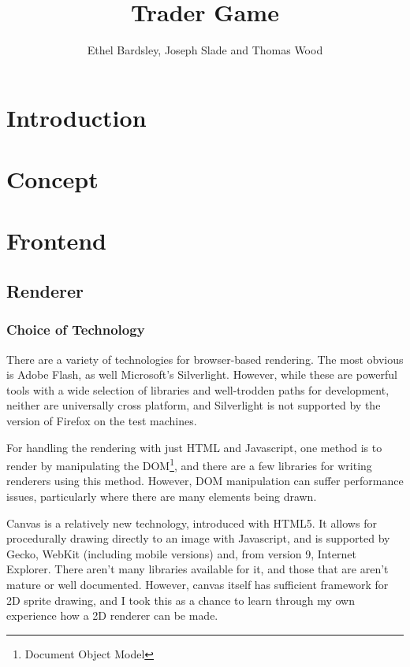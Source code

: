 \documentclass[12pt]{amsart}
\title{Trader Game}
\author{Ethel Bardsley, Joseph Slade and Thomas Wood}
\begin{document}
\maketitle

\section{Introduction}
\section{Concept}
\section{Frontend}
  \subsection{Renderer}
    \subsubsection{Choice of Technology}
      \begin{flushleft}
        There are a variety of technologies for browser-based rendering. The most obvious is Adobe Flash, as well Microsoft's Silverlight. However, while these are powerful tools with a wide selection of libraries and well-trodden paths for development, neither are universally cross platform, and Silverlight is not supported by the version of Firefox on the test machines.

        For handling the rendering with just HTML and Javascript, one method is to render by manipulating the DOM\footnote{Document Object Model}, and there are a few libraries for writing renderers using this method. However, DOM manipulation can suffer performance issues, particularly where there are many elements being drawn.

        Canvas is a relatively new technology, introduced with HTML5. It allows for procedurally drawing directly to an image with Javascript, and is supported by Gecko, WebKit (including mobile versions) and, from version 9, Internet Explorer. There aren't many libraries available for it, and those that are aren't mature or well documented. However, canvas itself has sufficient framework for 2D sprite drawing, and I took this as a chance to learn through my own experience how a 2D renderer can be made.
      \end{flushleft}
\end{document}
